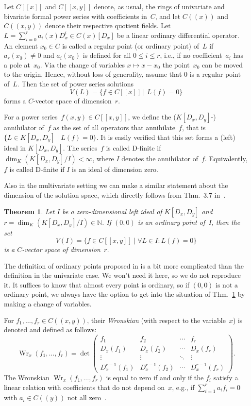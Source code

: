 \documentclass[a4paper,draft]{amsart}
\let\set\mathbb
\def\Wr{\operatorname{Wr}}
\newtheorem{thm}{Theorem}
\begin{document}
Let $C[[x]]$ and $C[[x,y]]$ denote, as usual, the rings of univariate
and bivariate formal power series with coefficients in~$C$, and let $C((x))$ and
$C((x,y))$ denote their respective quotient fields. Let
$L=\sum_{i=0}^r a_i(x)D_x^i \in C(x)[D_x]$ be a linear ordinary differential
operator. An element $x_0\in C$ is called a regular point (or ordinary point)
of~$L$ if $a_r(x_0)\neq0$ and $a_i(x_0)$ is defined for all $0\leq i\leq r$, i.e., if no
coefficient~$a_i$ has a pole at~$x_0$. Via the change of variables
$x\mapsto x-x_0$ the point~$x_0$ can be moved to the origin. Hence, without
loss of generality, assume that $0$ is a regular point of~$L$. Then the set of
power series solutions
\[
  V(L)=\{ f \in C[[x]] \mid L(f)=0 \}
\]
forms a $C$-vector space of dimension~$r$.

For a power series~$f(x,y)\in C[[x,y]]$, we define the ($K[D_x,D_y]$-)
annihilator of~$f$ as the set of all operators that annihilate~$f$,
that is $\{L\in K[D_x,D_y] \mid L(f)=0\}$. It is easily verified
that this set forms a (left) ideal in $K[D_x,D_y]$. The series~$f$ is
called D-finite if $\dim_K(K[D_x,D_y]/I)<\infty$, where $I$ denotes
the annihilator of~$f$. Equivalently, $f$ is called D-finite if $I$
is an ideal of dimension zero.

Also in the multivariate setting we can make
a similar statement about the dimension of the solution space, which
directly follows from Thm.~3.7 in~\cite{chen18}.

\begin{thm}\label{thm:solspace}
  Let $I$ be a zero-dimensional left ideal of $K[D_x,D_y]$ 
  and $r=\dim_K(K[D_x,D_y]/I)\in\set N$.
  If $(0,0)$ is an ordinary point of~$I$, then the set
  \[
  V(I)=\{f\in C[[x,y]]\mid\forall L\in I:L(f)=0\}
  \]
  is a $C$-vector space of dimension~$r$.
\end{thm}

The definition of ordinary points proposed in \cite{chen18} is a bit more
complicated than the definition in the univariate case. We won't need it
here, so we do not reproduce it. It suffices to know that almost every
point is ordinary, so if $(0,0)$ is not a ordinary point, we always have
the option to get into the situation of Thm.~\ref{thm:solspace} by making
a change of variables.

For $f_1,\dots,f_r\in C((x,y))$, their
\emph{Wronskian} (with respect to the variable~$x$) is denoted and
defined as follows:
\[
  \Wr_x(f_1,\dots,f_r) = \det
  \begin{pmatrix}
    f_1 & f_2 & \cdots & f_r \\
    D_x(f_1) & D_x(f_2) & \cdots & D_x(f_r) \\
    \vdots & \vdots & \ddots & \vdots \\
    D_x^{r-1}(f_1) & D_x^{r-1}(f_2) & \cdots & D_x^{r-1}(f_r)
  \end{pmatrix}.
\]
The Wronskian $\Wr_x(f_1,\dots,f_r)$ is equal to zero if and only
if the $f_i$ satisfy a linear relation with coefficients that do
not depend on~$x$, e.g., if $\sum_{i=1}^r a_i f_i = 0$ with
$a_i\in C((y))$ not all zero~\cite{bocher1901}.
\end{document}
